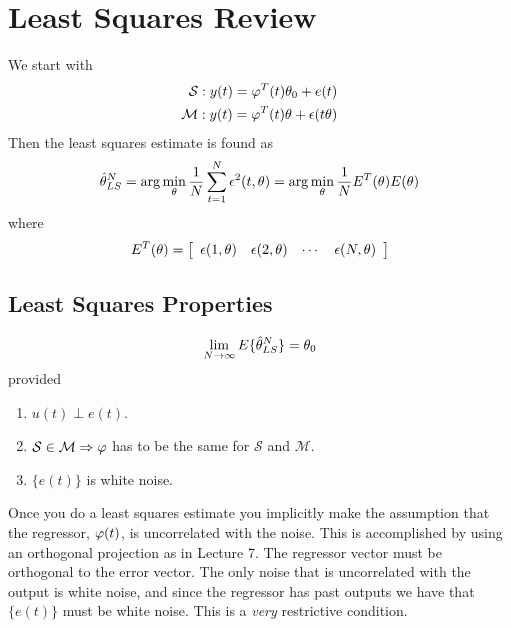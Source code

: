 \mainmatter%
\setcounter{page}{1}

\lectureseries[\course]{\course}

\date{September 24, 2009}

\setaddress%

\setcounter{lecture}{9}
\setcounter{chapter}{9}

%
\label{lec:IV}

\section{Least Squares Review}
We start with
\begin{align}
\mathcal{S}: y(t) = \varphi^T(t)\theta_0+e(t) \\
\mathcal{M}: y(t) = \varphi^T(t)\theta+\epsilon(t\theta)
\end{align}
Then the least squares estimate is found as
\begin{align*}
\hat{\theta}_{LS}^N = \arg\min_\theta \frac{1}{N} \sum_{t=1}^N \epsilon^2(t,\theta) = \arg\min_\theta \frac{1}{N} E^T(\theta)E(\theta)
\end{align*}
where
\begin{align*}
E^T(\theta) = \left[\begin{array}{c c c c} \epsilon(1,\theta) & \epsilon(2,\theta) & \cdots & \epsilon(N,\theta) \end{array}\right]
\end{align*}

\subsection{Least Squares Properties}
\begin{align*}
\lim_{N\to\infty} E\{\hat{\theta}_{LS}^N\} = \theta_0
\end{align*}
provided
\begin{enumerate}
\item $u(t)\perp e(t)$.
\item $\mathcal{S}\in\mathcal{M} \Rightarrow \varphi$ has to be the same for $\mathcal{S}$ and $\mathcal{M}$.
\item $\{e(t)\}$ is white noise.
\end{enumerate}
Once you do a least squares estimate you implicitly make the assumption that the regressor, $\varphi(t)$, is uncorrelated with the noise.
This is accomplished by using an orthogonal projection as in Lecture 7.
The regressor vector must be orthogonal to the error vector.
The only noise that is uncorrelated with the output is white noise, and since the regressor has past outputs we have that $\{e(t)\}$ must be white noise.
This is a \textit{very} restrictive condition.

